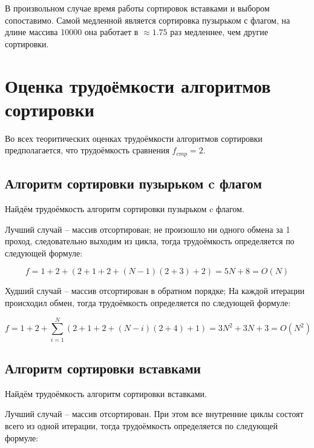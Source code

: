         В произвольном случае время работы сортировок вставками и выбором сопоставимо.
        Самой медленной является сортировка пузырьком с флагом,
        на длине массива 10000 она работает в $ \approx 1.75 $ раз медленнее,
        чем другие сортировки.
        

    \section{Оценка трудоёмкости алгоритмов сортировки}
        Во всех теоритических оценках трудоёмкости
        алгоритмов сортировки предполагается, что
        трудоёмкость сравнения $ f_{cmp} = 2 $.

        \subsection{Алгоритм сортировки пузырьком c флагом}
            Найдём трудоёмкость алгоритм сортировки пузырьком c флагом.
            
            Лучший случай -- массив отсортирован; 
            не произошло ни одного обмена за 1 проход,
            следовательно выходим из цикла, тогда
            трудоёмкость определяется по следующей формуле:

            \begin{equation}
                f = 1 + 2 + (2 + 1 + 2 + (N - 1) (2 + 3) + 2) = 5N + 8= O(N)
            \end{equation}

            Худший случай -- массив отсортирован в обратном порядке; 
            На каждой итерации происходил обмен, тогда
            трудоёмкость определяется по следующей формуле:

            \begin{equation}
                f = 1 + 2 + \sum_{i=1}^N (2 + 1 + 2 + (N - i)(2 + 4) + 1) = 3N^2 + 3N + 3 = O(N^2)
            \end{equation}

        \subsection{Алгоритм сортировки вставками}
            Найдём трудоёмкость алгоритм сортировки вставками.
                
            Лучший случай -- массив отсортирован. 
            При этом все внутренние циклы состоят всего из одной итерации, тогда
            трудоёмкость определяется по следующей формуле:

